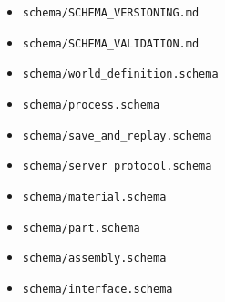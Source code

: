 \documentclass[9pt,a4paper,openany]{book}
\begin{document}
\begin{itemize}
\item \texttt{schema/\allowbreak{}SCHEMA\_\allowbreak{}VERSIONING.\allowbreak{}md}
\end{itemize}


\begin{itemize}
\item \texttt{schema/\allowbreak{}SCHEMA\_\allowbreak{}VALIDATION.\allowbreak{}md}
\end{itemize}


\begin{itemize}
\item \texttt{schema/\allowbreak{}world\_\allowbreak{}definition.\allowbreak{}schema}
\end{itemize}


\begin{itemize}
\item \texttt{schema/\allowbreak{}process.\allowbreak{}schema}
\end{itemize}


\begin{itemize}
\item \texttt{schema/\allowbreak{}save\_\allowbreak{}and\_\allowbreak{}replay.\allowbreak{}schema}
\end{itemize}


\begin{itemize}
\item \texttt{schema/\allowbreak{}server\_\allowbreak{}protocol.\allowbreak{}schema}
\end{itemize}


\begin{itemize}
\item \texttt{schema/\allowbreak{}material.\allowbreak{}schema}
\end{itemize}


\begin{itemize}
\item \texttt{schema/\allowbreak{}part.\allowbreak{}schema}
\end{itemize}


\begin{itemize}
\item \texttt{schema/\allowbreak{}assembly.\allowbreak{}schema}
\end{itemize}


\begin{itemize}
\item \texttt{schema/\allowbreak{}interface.\allowbreak{}schema}
\end{itemize}
\end{document}
